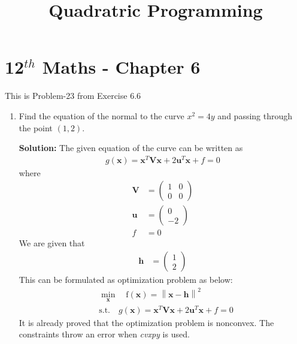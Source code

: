 \documentclass[12pt]{article}
\providecommand{\brak}[1]{\ensuremath{\left(#1\right)}}
\providecommand{\norm}[1]{\left\lVert#1\right\rVert}
\newcommand{\solution}{\noindent \textbf{Solution: }}
\newcommand{\myvec}[1]{\ensuremath{\begin{pmatrix}#1\end{pmatrix}}}
\let\vec\mathbf
\begin{document}
\begin{center}
	\title{\textbf{Quadratric Programming}}
\date{\vspace{-5ex}} %
\maketitle
\end{center}
\setcounter{page}{1}

\section{12$^{th}$ Maths - Chapter 6}
This is Problem-23 from Exercise 6.6 
\begin{enumerate}
	\item Find the equation of the normal to the curve $x^2=4y$ and passing through the point $(1,2)$.

\solution 
The given equation of the curve can be written as  
\begin{align}
	\label{eq:parabolaEq2}
	g\brak{\vec{x}} = \vec{x}^T\vec{V}\vec{x} + 2\vec{u}^T\vec{x} + f = 0 
\end{align}
where
\begin{align}
	\label{eq:eqV}
	\vec{V} &= \myvec{ 1 & 0 \\ 0 & 0} \\
	\label{eq:eqU}
	\vec{u} &= \myvec{0 \\ -2} \\
	\label{eq:eqF}
	f &= 0 
\end{align}
We are given that 
\begin{align}
	\vec{h} &= \myvec{1 \\ 2}
\end{align}
This can be formulated as optimization problem as below:
\begin{align}
	\label{eq:Eq3}
	&  \min_{\vec{x}} \quad \text{f}\brak{\vec{x}} = \norm{\vec{x}-\vec{h}}^2\\
	\label{eq:Eq4}
	& \text{s.t.}\quad g\brak{\vec{x}} = \vec{x}^T\vec{V}\vec{x} + 2\vec{u}^T\vec{x} + f = 0  
\end{align}
It is already proved that the optimization problem is nonconvex. The constraints throw an error when \textit{cvxpy} is used. 


\end{enumerate}
\end{document}
